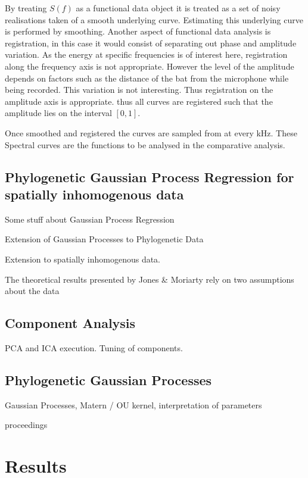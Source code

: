 \documentclass[wsdraft]{ws-rv9x6} %
\begin{document}
By treating \(S(f)\) as a functional data object it is treated as a set of noisy realisations taken of a smooth underlying curve. Estimating this underlying curve is performed by smoothing. Another aspect of functional data analysis is registration, in this case it would consist of separating out phase and amplitude variation. As the energy at specific frequencies is of interest here, registration along the frequency axis is not appropriate. However the level of the amplitude depends on factors such as the distance of the bat from the microphone while being recorded. This variation is not interesting. Thus registration on the amplitude axis is appropriate. thus all curves are registered such that the amplitude lies on the interval \([0,1]\). 

Once smoothed and registered the curves are sampled from at every kHz. These Spectral curves are the functions to be analysed in the comparative analysis.

\subsection{Phylogenetic Gaussian Process Regression for spatially inhomogenous data}

Some stuff about Gaussian Process Regression

Extension of Gaussian Processes to Phylogenetic Data

Extension to spatially inhomogenous data.

The theoretical results presented by Jones \& Moriarty\cite{jones2013evolutionary} rely on two assumptions about the data

\subsection{Component Analysis}

PCA and ICA execution. Tuning of components.

\subsection{Phylogenetic Gaussian Processes}

Gaussian Processes, Matern / OU kernel, interpretation of parameters

proceedings 

\section{Results}
\end{document}
